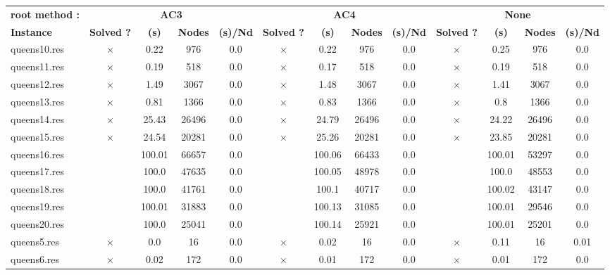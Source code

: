 \documentclass[main.tex]{subfiles}
\begin{document}
\thispagestyle{empty}

\begin{landscape}
\begin{center}
\renewcommand{\arraystretch}{1.4} 
\begin{tabular}{lcccccccccccc}
	\hline
\textbf{root method :} & \multicolumn{4}{c}{\textbf{AC3}} & \multicolumn{4}{c}{\textbf{AC4}} & \multicolumn{4}{c}{\textbf{None}}\\
\textbf{Instance}  & \textbf{Solved ?} & \textbf{(s)} & \textbf{Nodes} & \textbf{(s)/Nd} & \textbf{Solved ?} & \textbf{(s)} & \textbf{Nodes} & \textbf{(s)/Nd} & \textbf{Solved ?} & \textbf{(s)} & \textbf{Nodes} & \textbf{(s)/Nd}\\\hline

queens10.res & $\times$ & 0.22 & 976 & 0.0
 & $\times$ & 0.22 & 976 & 0.0
 & $\times$ & 0.25 & 976 & 0.0
\\
queens11.res & $\times$ & 0.19 & 518 & 0.0
 & $\times$ & 0.17 & 518 & 0.0
 & $\times$ & 0.19 & 518 & 0.0
\\
queens12.res & $\times$ & 1.49 & 3067 & 0.0
 & $\times$ & 1.48 & 3067 & 0.0
 & $\times$ & 1.41 & 3067 & 0.0
\\
queens13.res & $\times$ & 0.81 & 1366 & 0.0
 & $\times$ & 0.83 & 1366 & 0.0
 & $\times$ & 0.8 & 1366 & 0.0
\\
queens14.res & $\times$ & 25.43 & 26496 & 0.0
 & $\times$ & 24.79 & 26496 & 0.0
 & $\times$ & 24.22 & 26496 & 0.0
\\
queens15.res & $\times$ & 24.54 & 20281 & 0.0
 & $\times$ & 25.26 & 20281 & 0.0
 & $\times$ & 23.85 & 20281 & 0.0
\\
queens16.res &  & 100.01 & 66657 & 0.0
 &  & 100.06 & 66433 & 0.0
 &  & 100.01 & 53297 & 0.0
\\
queens17.res &  & 100.0 & 47635 & 0.0
 &  & 100.05 & 48978 & 0.0
 &  & 100.0 & 48553 & 0.0
\\
queens18.res &  & 100.0 & 41761 & 0.0
 &  & 100.1 & 40717 & 0.0
 &  & 100.02 & 43147 & 0.0
\\
queens19.res &  & 100.01 & 31883 & 0.0
 &  & 100.13 & 31085 & 0.0
 &  & 100.01 & 29546 & 0.0
\\
queens20.res &  & 100.0 & 25041 & 0.0
 &  & 100.14 & 25921 & 0.0
 &  & 100.01 & 25201 & 0.0
\\
queens5.res & $\times$ & 0.0 & 16 & 0.0
 & $\times$ & 0.02 & 16 & 0.0
 & $\times$ & 0.11 & 16 & 0.01
\\
queens6.res & $\times$ & 0.02 & 172 & 0.0
 & $\times$ & 0.01 & 172 & 0.0
 & $\times$ & 0.01 & 172 & 0.0

\end{tabular}
\end{center}
\end{landscape}
\end{document}
